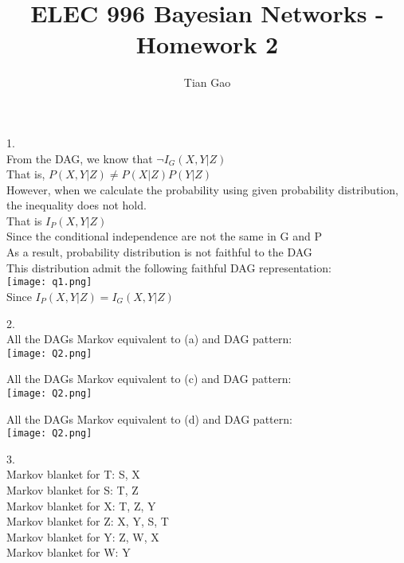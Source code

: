 \documentclass[a4paper]{article}
\title{ELEC 996 Bayesian Networks - Homework 2}
\author{Tian Gao}
\begin{document}
\maketitle

1. \\
From the DAG, we know that $\neg I_G(X, Y|Z)$\\
That is, $P(X, Y|Z) \neq P(X|Z)P(Y|Z)$\\
However, when we calculate the probability using given probability distribution, the inequality does not hold. \\
That is $I_P(X, Y|Z)$\\
Since the conditional independence are not the same in G and P\\
As a result, probability distribution is not faithful to the DAG\\
This distribution admit the following faithful DAG representation:\\
\texttt{[image: q1.png]}\\
Since $I_P(X, Y|Z) = I_G(X, Y|Z)$ 

2. \\
All the DAGs Markov equivalent to (a) and DAG pattern:\\
\texttt{[image: Q2.png]}

All the DAGs Markov equivalent to (c) and DAG pattern:\\
\texttt{[image: Q2.png]}

All the DAGs Markov equivalent to (d) and DAG pattern:\\
\texttt{[image: Q2.png]}


3. \\
Markov blanket for T: {S, X}\\
Markov blanket for S: {T, Z}\\
Markov blanket for X: {T, Z, Y}\\
Markov blanket for Z: {X, Y, S, T}\\
Markov blanket for Y: {Z, W, X}\\
Markov blanket for W: {Y}\\
\end{document}
